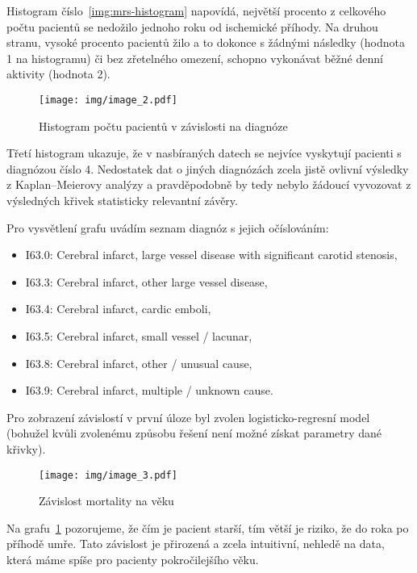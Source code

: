 Histogram číslo~\ref{img:mrs-histogram} napovídá, největší procento z celkového počtu pacientů se nedožilo jednoho roku od ischemické příhody.
Na druhou stranu, vysoké procento pacientů žilo a to dokonce s žádnými následky (hodnota 1 na histogramu) či bez zřetelného omezení, schopno vykonávat běžné denní aktivity (hodnota 2).

\begin{figure}[htbp]
    \texttt{[image: img/image\_2.pdf]}
    \centering
    \caption{Histogram počtu pacientů v závislosti na diagnóze}
\end{figure}
\FloatBarrier

Třetí histogram ukazuje, že v nasbíraných datech se nejvíce vyskytují pacienti s diagnózou číslo 4.
Nedostatek dat o jiných diagnózách zcela jistě ovlivní výsledky z Kaplan–Meierovy analýzy a pravděpodobně by tedy nebylo žádoucí vyvozovat z výsledných křivek statisticky relevantní závěry.

Pro vysvětlení grafu uvádím seznam diagnóz s jejich očíslováním:

\begin{itemize}
    \item I63.0: Cerebral infarct, large vessel disease with significant carotid stenosis,
    \item I63.3: Cerebral infarct, other large vessel disease,
    \item I63.4: Cerebral infarct, cardic emboli,
    \item I63.5: Cerebral infarct, small vessel / lacunar,
    \item I63.8: Cerebral infarct, other / unusual cause,
    \item I63.9: Cerebral infarct, multiple / unknown cause.
\end{itemize}

Pro zobrazení závislostí v první úloze byl zvolen logisticko-regresní model (bohužel kvůli zvolenému způsobu řešení není možné získat parametry dané křivky).

\begin{figure}[htbp]
    \texttt{[image: img/image\_3.pdf]}
    \centering
    \caption{Závislost mortality na věku}
    \label{img:mrs-age}
\end{figure}
\FloatBarrier

Na grafu~\ref{img:mrs-age} pozorujeme, že čím je pacient starší, tím větší je riziko, že do roka po příhodě umře.
Tato závislost je přirozená a zcela intuitivní, nehledě na data, která máme spíše pro pacienty pokročilejšího věku.

